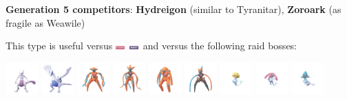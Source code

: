 \documentclass[8pt,aspectratio=169,compress]{beamer}
\newcommand{\ghostfull}{\includegraphics[height=0.15cm]{../../images/type/full/Ghost.png}}
\newcommand{\psychicfull}{\includegraphics[height=0.15cm]{../../images/type/full/Psychic.png}}
\begin{document}
\begin{frame}
\begin{tiny}
\begin{block}{}
\begin{center}
\textbf{Generation 5 competitors}: \textbf{Hydreigon} (similar to Tyranitar), \textbf{Zoroark} (as fragile as Weawile)
\end{center}
\end{block}

\begin{block}{}\begin{center}
This type is useful versus \psychicfull~\ghostfull~and versus the following raid bosses:

    \includegraphics[width=1.25cm]{../../images/pokemon/mewtwo.png}
    \includegraphics[width=1.25cm]{../../images/pokemon/lugia.png}
    \includegraphics[width=1.25cm]{../../images/pokemon/deoxys_n.png}
    \includegraphics[width=1.25cm]{../../images/pokemon/deoxys_a.png}
    \includegraphics[width=1.25cm]{../../images/pokemon/deoxys_d.png}
    \includegraphics[width=1.25cm]{../../images/pokemon/deoxys_s.png}
    \includegraphics[width=1.25cm]{../../images/pokemon/uxie.png}
    \includegraphics[width=1.25cm]{../../images/pokemon/mesprit.png}
    \includegraphics[width=1.25cm]{../../images/pokemon/azelf.png}

\end{center}
\end{block}
\end{tiny}
\end{frame}
\end{document}
